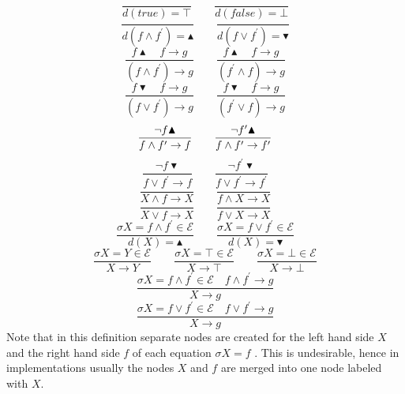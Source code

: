 \documentclass{article}
\begin{document}
\begin{equation*}
\frac{{}}{d(true) = \top }\qquad \frac{{}}{d(false) = \bot }
\end{equation*}
\begin{equation*}
\frac{{}}{d(f \wedge f^{\prime}) = \blacktriangle } \qquad
\frac{{}}{d(f \vee f^{\prime}) = \blacktriangledown }
\end{equation*}
\begin{equation*}
\frac{f\blacktriangle \quad f\rightarrow g}{(f\wedge f^{\prime })\rightarrow g} \qquad
\frac{f\blacktriangle \quad f\rightarrow g}{(f^{\prime }\wedge f)\rightarrow g}
\end{equation*}%
\begin{equation*}
\frac{f\blacktriangledown \quad f\rightarrow g}{(f\vee f^{\prime })\rightarrow g} \qquad
\frac{f\blacktriangledown \quad f\rightarrow g}{(f^{\prime }\vee f)\rightarrow g}
\end{equation*}%
\begin{equation*}
\frac{\lnot f\blacktriangle }{f\wedge f^{\prime }\rightarrow f}\qquad \frac{%
\lnot f^{\prime }\blacktriangle }{f\wedge f^{\prime }\rightarrow f^{\prime }}
\end{equation*}%
\begin{equation*}
\frac{\lnot f\blacktriangledown }{f\vee f^{\prime }\rightarrow f}\qquad
\frac{\lnot f^{\prime }\blacktriangledown }{f\vee f^{\prime }\rightarrow
f^{\prime }}
\end{equation*}%
\begin{equation*}
\frac{{}}{X\wedge f\rightarrow X}\qquad \frac{{}}{f\wedge X\rightarrow X}
\end{equation*}%
\begin{equation*}
\frac{{}}{X\vee f\rightarrow X}\qquad \frac{{}}{f\vee X\rightarrow X}
\end{equation*}%
\begin{equation*}
\frac{\sigma X=f\wedge f^{\prime }\in \mathcal{E}}{d(X) = \blacktriangle }\qquad
\frac{\sigma X=f\vee f^{\prime }\in \mathcal{E}}{d(X) = \blacktriangledown }
\end{equation*}%
\begin{equation*}
\frac{\sigma X=Y\in \mathcal{E}}{X\rightarrow Y}\qquad \frac{\sigma X=\top
\in \mathcal{E}}{X\rightarrow \top }\qquad \frac{\sigma X=\bot \in \mathcal{E%
}}{X\rightarrow \bot }
\end{equation*}%
\begin{equation*}
\frac{\sigma X=f\wedge f^{\prime }\in \mathcal{E}\quad f\wedge f^{\prime
}\rightarrow g}{X\rightarrow g}
\end{equation*}%
\begin{equation*}
\frac{\sigma X=f\vee f^{\prime }\in \mathcal{E}\quad f\vee f^{\prime
}\rightarrow g}{X\rightarrow g}
\end{equation*}%
Note that in this definition separate nodes are created for the left hand
side $X$ and the right hand side $f$ of each equation $\sigma X=f$ . This is
undesirable, hence in implementations usually the nodes $X$ and $f$ are
merged into one node labeled with $X$.
\end{document}
